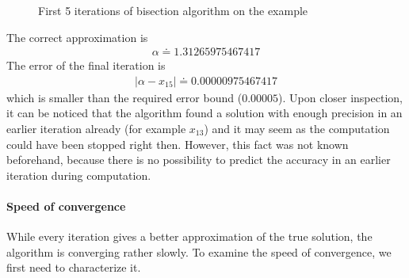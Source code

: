 \documentclass[
  digital, %
  table,   %
  nolof,     %
  nolot,     %
	draft, %
]{fithesis3}
\begin{document}
\begin{figure}
\centering
\def\FunctionF(#1){2*(#1)^4-3*(#1)-2}%
\caption{First 5 iterations of bisection algorithm on the example} \label{fig:bisp}
\end{figure}

The correct approximation is
\begin{align}
      \alpha \doteq 1.31265975467417
\end{align}
The error of the final iteration is
\begin{align}
      |\alpha - x_{15}| \doteq 0.00000975467417
\end{align}
which is smaller than the required error bound ($0.00005$). Upon closer inspection, it can be noticed that the algorithm found a solution with enough precision in an earlier iteration already (for example $x_{13}$) and it may seem as the computation could have been stopped right then. However, this fact was not known beforehand, because there is no possibility to predict the accuracy in an earlier iteration during computation.

\paragraph{Speed of convergence}
While every iteration gives a better approximation of the true solution, the algorithm is converging rather slowly. To examine the speed of convergence, we first need to characterize it.
\end{document}
